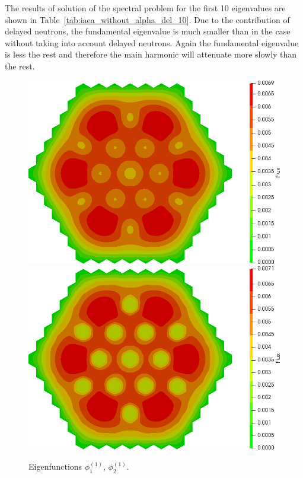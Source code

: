 \documentclass[authoryear]{elsarticle}
\begin{document}
The results of solution of the spectral problem for the first 10 eigenvalues are shown in Table~\ref{tab:iaea_without_alpha_del_10}.
Due to the contribution of delayed neutrons, the fundamental eigenvalue is much smaller than in the case without taking into account delayed neutrons.
Again the fundamental eigenvalue is less the rest and therefore the main harmonic  will attenuate more slowly than the rest.

\begin{figure}[h]
\begin{center}
	\includegraphics[width=0.49\linewidth]{iaea_without/alpha_delayed_sp3_u1_1_without.png}
	\includegraphics[width=0.49\linewidth]{iaea_without/alpha_delayed_sp3_u2_1_without.png}\\
	\caption{Eigenfunctions $\phi_1^{(1)}$, $\phi_2^{(1)}$.}
	\label{fig:iaea_without_fun_del_1}
\end{center}
\end{figure}
\end{document}
